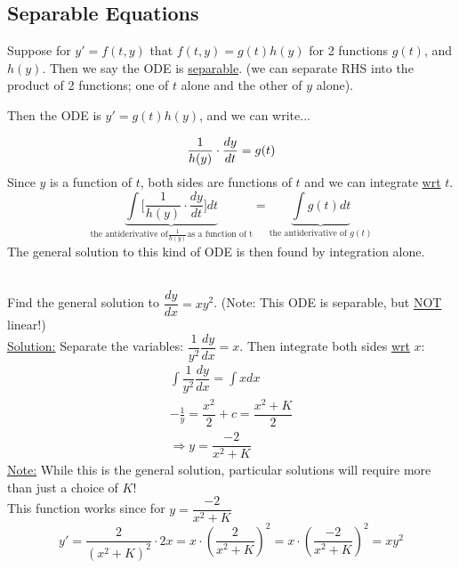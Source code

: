 \subsection*{Separable Equations}
\begin{definition-N}
Suppose for $y' = f(t, y)$ that $f(t,y) = g(t)h(y)$ for 2 functions $g(t)$, and $h(y)$. Then we say the ODE is \underline{separable}. (we can separate RHS into the product of 2 functions; one of $t$ alone and the other of $y$ alone).\\
\end{definition-N}
Then the ODE is $y' = g(t)h(y)$, and we can write...

\begin{equation*}
	\dfrac{1}{h(y)} \cdot \dfrac{dy}{dt} = g(t)\\
\end{equation*}
Since $y$ is a function of $t$, both sides are functions of $t$ and we can integrate \underline{wrt} $t$.
\begin{equation*}
	\underbrace{\int \bigg[\dfrac{1}{h(y)} \cdot \dfrac{dy}{dt}\bigg] dt}_{\text{the antiderivative of} \frac{1}{h(y)} \text{as a function of t}} = \underbrace{\int g(t) dt}_{\text{the antiderivative of }g(t)} \tag{$\star$}
\end{equation*}
The general solution to this kind of ODE is then found by integration alone.\\
\redhline\\
\begin{example-N}
	Find the general solution to $\dfrac{dy}{dx} = xy^2$. (Note: This ODE is separable, but \underline{NOT} linear!)\\
	\underline{Solution:} Separate the variables: $\dfrac{1}{y^2} \dfrac{dy}{dx} = x$. Then integrate both sides \underline{wrt} $x$:
	\begin{align*}
		\int \dfrac{1}{y^2} \dfrac{dy}{dx} = \int x dx\\
		-\frac{1}{y}  = \dfrac{x^2}{2} + c = \dfrac{x^2 + K}{2} \\
		\Rightarrow \boxed{y = \dfrac{-2}{x^2 + K}}
	\end{align*}
	\underline{Note:} While this is the general solution, particular solutions will require more than just a choice of $K$!\\
	This function works since for $y = \dfrac{-2}{x^2 + K}$\\
	\begin{equation*}
		y' = \dfrac{2}{(x^2 + K)^2}\cdot 2x = x\cdot (\dfrac{2}{x^2+K})^2 = x\cdot(\dfrac{-2}{x^2+K})^2 = xy^2
	\end{equation*}
\end{example-N}
\redhline
